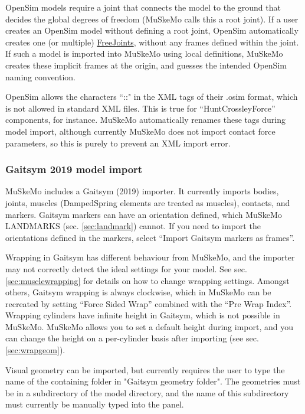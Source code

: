 \documentclass{article}
\begin{document}
OpenSim models require a joint that connects the model to the ground that decides the global degrees of freedom (MuSkeMo calls this a root joint). If a user creates an OpenSim model without defining a root joint, OpenSim automatically creates one (or multiple) \href{https://simtk.org/api_docs/opensim/api_docs/classOpenSim_1_1FreeJoint.html}{FreeJoints}, without any frames defined within the joint. If such a model is imported into MuSkeMo using local definitions, MuSkeMo creates these implicit frames at the origin, and guesses the intended OpenSim naming convention.


OpenSim allows the characters ``::" in the XML tags of their .osim format, which is not allowed in standard XML files. This is true for ``HuntCrossleyForce'' components, for instance. MuSkeMo automatically renames these tags during model import, although currently MuSkeMo does not import contact force parameters, so this is purely to prevent an XML import error.

\subsubsection{Gaitsym 2019 model import}

MuSkeMo includes a Gaitsym (2019) importer. It currently imports bodies, joints, muscles (DampedSpring elements are treated as muscles), contacts, and markers. Gaitsym markers can have an orientation defined, which MuSkeMo LANDMARKS (sec. \ref{sec:landmark}) cannot. If you need to import the orientations defined in the markers, select ``Import Gaitsym markers as frames''. 

Wrapping in Gaitsym has different behaviour from MuSkeMo, and the importer may not correctly detect the ideal settings for your model. See sec. \ref{sec:musclewrapping} for details on how to change wrapping settings. Amongst others, Gaitsym wrapping is always clockwise, which in MuSkeMo can be recreated by setting ``Force Sided Wrap'' combined with the ``Pre Wrap Index''.
Wrapping cylinders have infinite height in Gaitsym, which is not possible in MuSkeMo. MuSkeMo allows you to set a default height during import, and you can change the height on a per-cylinder basis after importing (see sec. \ref{sec:wrapgeom}).

Visual geometry can be imported, but currently requires the user to type the name of the containing folder in "Gaitsym geometry folder". The geometries must be in a subdirectory of the model directory, and the name of this subdirectory must currently be manually typed into the panel.
\end{document}

